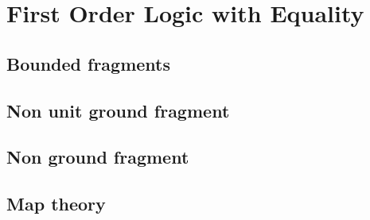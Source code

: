 \chapter{First Order Logic with Equality}
\section{Bounded fragments}
\section{Non unit ground fragment}
\section{Non ground fragment}
\section{Map theory}
